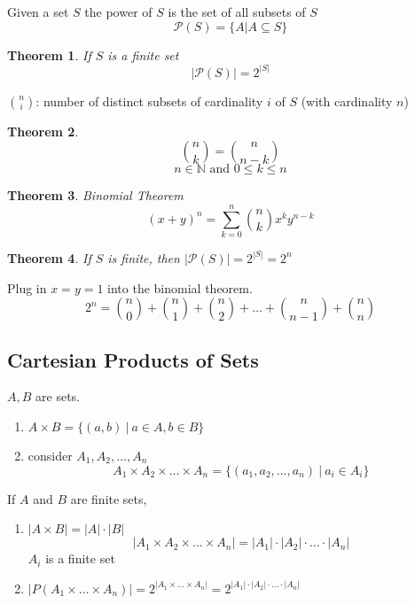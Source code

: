 \documentclass[letterpaper, 12pt]{article}
\newtheorem{theorem}{Theorem}[section]
\newenvironment{proof}[1][Proof]{\begin{trivlist}
\item[\hskip \labelsep {\bfseries #1}]}{\end{trivlist}}
\newenvironment{definition}[1][Definition]{\begin{trivlist}
\item[\hskip \labelsep {\bfseries #1}]}{\end{trivlist}}
\newenvironment{remark}[1][Remark]{\begin{trivlist}
\item[\hskip \labelsep {\bfseries #1}]}{\end{trivlist}}
\begin{document}
    \begin{definition}
        Given a set $S$ the power of $S$ is the set of all subsets of $S$
        \[\mathcal{P}(S) = \{A | A \subseteq S\}\]
    \end{definition}
    \begin{theorem}
        If $S$ is a finite set
        \[|\mathcal{P}(S)| = 2^{|S|}\]
    \end{theorem}
    $\binom{n}{i}$: number of distinct subsets of cardinality $i$ of $S$ (with cardinality $n$)
    \begin{theorem}
        \[\binom{n}{k} = \binom{n}{n - k}\]
        \[n \in \mathbb{N} \text{ and } 0 \le k \le n\]
    \end{theorem}
    \begin{theorem}
        Binomial Theorem
        \[(x + y)^n = \sum_{k = 0}^{n} \binom{n}{k} x^k y^{n - k}\]
    \end{theorem}
    \begin{theorem}
        If $S$ is finite, then $|\mathcal{P}(S)| = 2^{|S|} = 2^n$
    \end{theorem}
    \begin{proof}
        Plug in $x = y = 1$ into the binomial theorem.
        \[2^n = \binom{n}{0} + \binom{n}{1} + \binom{n}{2} + \dots + \binom{n}{n-1} + \binom{n}{n}\]
    \end{proof}
    \subsection*{Cartesian Products of Sets}
    \begin{definition}
        $A, B$ are sets.
        \begin{enumerate}
            \item $A \times B = \{(a, b) \: | \: a \in A, b \in B\}$
            \item consider $A_1, A_2, \dots, A_n$
            \[A_1 \times A_2 \times \dots \times A_n = \{(a_1, a_2, \dots, a_n) \: | \: a_i \in A_i\}\]
        \end{enumerate}
    \end{definition}
    \begin{remark}
        If $A$ and $B$ are finite sets,
        \begin{enumerate}
            \item $|A \times B| = |A| \cdot |B|$
            \[|A_1 \times A_2 \times \dots \times A_n| = |A_1| \cdot |A_2| \cdot \dots \cdot |A_n|\]
            $A_i$ is a finite set
            \item $|P(A_1 \times \dots \times A_n)| = 2^{|A_1 \times \dots \times A_n|}
            = 2^{|A_1| \cdot |A_2| \cdot \dots \cdot |A_n|}$
        \end{enumerate}
    \end{remark}
\end{document}
